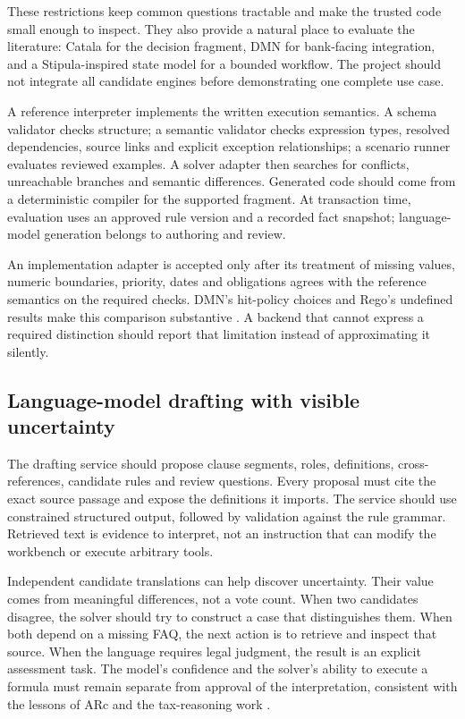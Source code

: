 These restrictions keep common questions tractable and make the trusted code
small enough to inspect. They also provide a natural place to evaluate the
literature: Catala for the decision fragment, DMN for bank-facing integration,
and a Stipula-inspired state model for a bounded workflow. The project should not
integrate all candidate engines before demonstrating one complete use case.

A reference interpreter implements the written execution semantics. A schema
validator checks structure; a semantic validator checks expression types,
resolved dependencies,
source links and explicit exception relationships; a scenario runner evaluates
reviewed examples. A solver adapter then searches for conflicts, unreachable
branches and semantic differences. Generated code should come from a deterministic
compiler for the supported fragment. At transaction time, evaluation uses an
approved rule version and a recorded fact snapshot; language-model generation
belongs to authoring and review.

An implementation adapter is accepted only after its treatment of missing
values, numeric boundaries, priority, dates and obligations agrees with the
reference semantics on the required checks. DMN's hit-policy choices and Rego's
undefined results make this comparison substantive
\citep{dmn2024,opadocs}. A backend that cannot express a required distinction
should report that limitation instead of approximating it silently.



\subsection{Language-model drafting with visible uncertainty}

The drafting service should propose clause segments, roles, definitions,
cross-references, candidate rules and review questions. Every proposal must cite
the exact source passage and expose the definitions it imports. The service
should use constrained structured output, followed by validation against the
rule grammar. Retrieved text is evidence to interpret, not an instruction that
can modify the workbench or execute arbitrary tools.

Independent candidate translations can help discover uncertainty. Their value
comes from meaningful differences, not a vote count. When two candidates disagree,
the solver should try to construct a case that distinguishes them. When both
depend on a missing FAQ, the next action is to retrieve and inspect that source.
When the language requires legal judgment, the result is an explicit assessment
task. The model's confidence and the solver's ability to execute a formula must
remain separate from approval of the interpretation, consistent with the lessons
of ARc and the tax-reasoning work \citep{arc2025,jurayj2026}.

